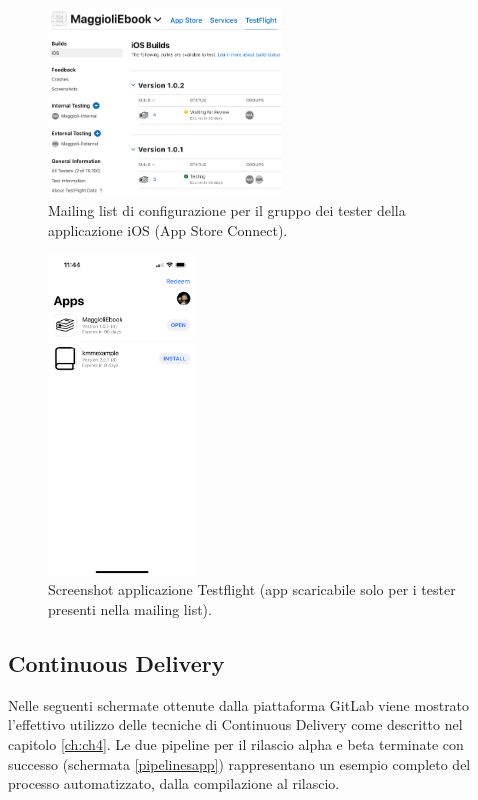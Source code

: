 \newpage
\begin{multicols}{2}
\begin{figure}[H]
\centering
    \includegraphics[width=0.55\textwidth]{img/Screenshot 2022-10-05 at 11.34.06.png}
    \caption{Mailing list di configurazione per il gruppo dei tester della applicazione iOS (App Store Connect).}
    \label{appstoreconnect}
\end{figure}
\begin{figure}[H]
\centering
    \includegraphics[width=0.35\textwidth]{img/IMG_1221.png}
    \caption{Screenshot applicazione Testflight (app scaricabile solo per i tester presenti nella mailing list).}
    \label{testflight}
\end{figure}
\end{multicols}

\subsection{Continuous Delivery}
Nelle seguenti schermate ottenute dalla piattaforma GitLab viene mostrato l'effettivo utilizzo delle tecniche di Continuous Delivery come descritto nel capitolo \ref{ch:ch4}. Le due pipeline per il rilascio alpha e beta terminate con successo (schermata \ref{pipelinesapp}) rappresentano un esempio completo del processo automatizzato, dalla compilazione al rilascio.


